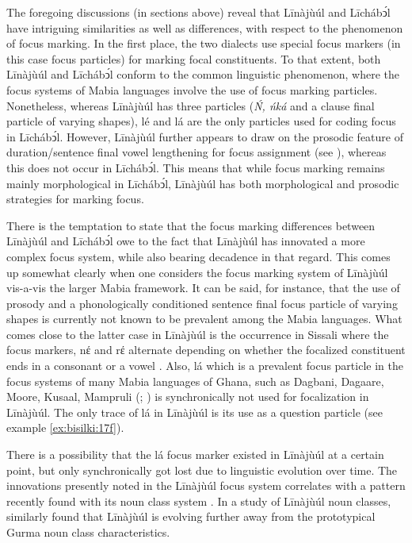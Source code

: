 \documentclass[output=paper,colorlinks,citecolor=brown]{langscibook}
\begin{document}
The foregoing discussions (in sections above) reveal that Līnàjùúl and Līchábͻ́l have intriguing similarities as well as differences, with respect to the phenomenon of focus marking. In the first place, the two dialects use special focus markers (in this case focus particles) for marking focal constituents. To that extent, both Līnàjùúl and Līchábͻ́l conform to the common linguistic phenomenon, where the focus systems of Mabia languages involve the use of focus marking particles. Nonetheless, whereas Līnàjùúl has three particles (\textit{Ń, ńká} and a clause final particle of varying shapes), lé and lá are the only particles used for coding focus in Līchábͻ́l. However, Līnàjùúl further appears to draw on the prosodic feature of duration/sentence final vowel lengthening for focus assignment (see ), whereas this does not occur in Līchábͻ́l. This means that while focus marking remains mainly morphological in Līchábͻ́l, Līnàjùúl has both morphological and prosodic strategies for marking focus.

There is the temptation to state that the focus marking differences between Līnàjùúl and Līchábͻ́l owe to the fact that Līnàjùúl has innovated a more complex focus system, while also bearing decadence in that regard. This comes up somewhat clearly when one considers the focus marking system of Līnàjùúl vis-a-vis the larger Mabia framework. It can be said, for instance, that the use of prosody and a phonologically conditioned sentence final focus particle of varying shapes is currently not known to be prevalent among the Mabia languages. What comes close to the latter case in Līnàjùúl is the occurrence in Sissali where the focus markers, nέ and rέ alternate depending on whether the focalized constituent ends in a consonant or a vowel \citep{Dumah2017}. Also, lá which is a prevalent focus particle in the focus systems of many Mabia languages of Ghana, such as Dagbani, Dagaare, Moore, Kusaal, Mampruli (\citealt[93]{bodomo1997}; \citealt{Dakubu2003, Issah2013Focus, Saanchi2005}) is synchronically not used for focalization in Līnàjùúl. The only trace of lá in Līnàjùúl is its use as a question particle (see example \ref{ex:bisilki:17f}).

There is a possibility that the lá focus marker existed in Līnàjùúl at a certain point, but only synchronically got lost due to linguistic evolution over time. The innovations presently noted in the Līnàjùúl focus system correlates with a pattern recently found with its noun class system \citep{BisilkiAkpanglo-Nartey2017}. In a study of Līnàjùúl noun classes, \citet{BisilkiAkpanglo-Nartey2017} similarly found that Līnàjùúl is evolving further away from the prototypical Gurma noun class characteristics.
\end{document}
